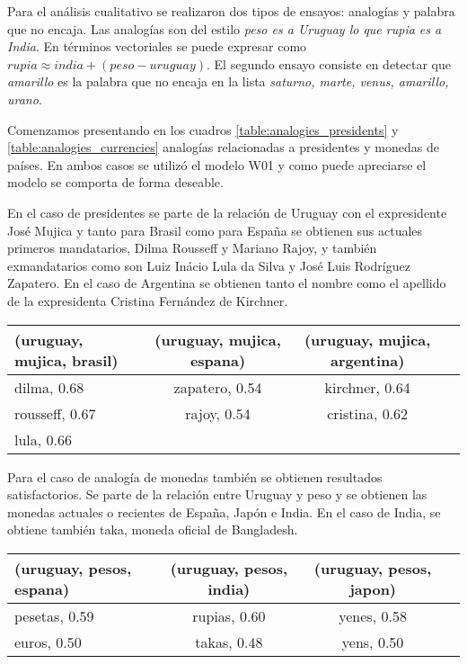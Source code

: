 Para el análisis cualitativo se realizaron dos tipos de ensayos: analogías y palabra que no encaja. Las
analogías son del estilo \textit{peso es a Uruguay lo que rupia es a India}. En términos vectoriales
se puede expresar como $rupia \approx india + (peso - uruguay)$. El segundo ensayo consiste en
detectar que \textit{amarillo} es la palabra que no encaja en la lista \textit{saturno, marte, venus,
amarillo, urano}.

Comenzamos presentando en los cuadros \ref{table:analogies_presidents} y
\ref{table:analogies_currencies} analogías relacionadas a presidentes y monedas de países. En ambos
casos se utilizó el modelo W01 y como puede apreciarse el modelo se comporta de forma deseable.

En el caso de presidentes se parte de la relación de Uruguay con el expresidente José Mujica y tanto
para Brasil como para España se obtienen sus actuales primeros mandatarios, Dilma Rousseff y
Mariano Rajoy, y también exmandatarios como son Luiz Inácio Lula da Silva y José Luis Rodríguez
Zapatero. En el caso de Argentina se obtienen tanto el nombre como el apellido de la expresidenta
Cristina Fernández de Kirchner.

\begin{table*}[ht]
    \centering
    \begin{tabular}{lccc}
        \hline
        (uruguay, mujica, brasil) & (uruguay, mujica, espana) & (uruguay, mujica, argentina)\\
        \hline
        dilma, 0.68 & zapatero, 0.54 & kirchner, 0.64\\
        rousseff, 0.67 & rajoy, 0.54 & cristina, 0.62\\
        lula, 0.66\\
        \hline
    \end{tabular}
    \caption{Analogías para países y presidentes.}
    \label{table:analogies_presidents}
\end{table*}

Para el caso de analogía de monedas también se obtienen resultados satisfactorios. Se parte de
la relación entre Uruguay y peso y se obtienen las monedas actuales o recientes de España, Japón
e India. En el caso de India, se obtiene también taka, moneda oficial de Bangladesh.

\begin{table*}[ht]
    \centering
    \begin{tabular}{lccc}
        \hline
        (uruguay, pesos, espana) & (uruguay, pesos, india) & (uruguay, pesos, japon)\\
        \hline
        pesetas, 0.59 & rupias, 0.60 & yenes, 0.58\\
        euros, 0.50 & takas, 0.48 & yens, 0.50\\
        \hline
    \end{tabular}
    \caption{Analogías para países y monedas.}
    \label{table:analogies_currencies}
\end{table*}

